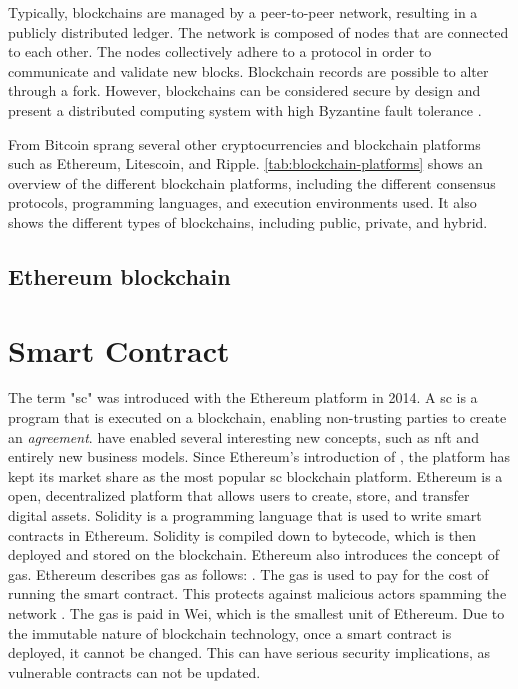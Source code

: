 Typically, blockchains are managed by a peer-to-peer network, resulting in a publicly distributed ledger. The network is composed of nodes that are connected to each other. The nodes collectively adhere to a protocol in order to communicate and validate new blocks. Blockchain records are possible to alter through a \gls{fork}. However, blockchains can be considered secure by design and present a distributed computing system with high Byzantine fault tolerance \cite{sankar2017survey}.

From Bitcoin sprang several other cryptocurrencies and blockchain platforms such as Ethereum, Litescoin, and Ripple. \cref{tab:blockchain-platforms} shows an overview of the different blockchain platforms, including the different consensus protocols, programming languages, and execution environments used. It also shows the different types of blockchains, including public, private, and hybrid.


\subsection{Ethereum blockchain}
\label{sec:ethereum}


\section{Smart Contract}
\label{sec:smart-contract}

The term "\acrlong{sc}" was introduced with the Ethereum platform in 2014. A \acrfull{sc} is a program that is executed on a blockchain, enabling non-trusting parties to create an \textit{agreement}.  have enabled several interesting new concepts, such as \acrfull{nft} and entirely new business models. Since Ethereum's introduction of , the platform has kept its market share as the most popular \acrshort{sc} blockchain platform. Ethereum is a open, decentralized platform that allows users to create, store, and transfer digital assets. Solidity is a programming language that is used to write smart contracts in Ethereum. Solidity is compiled down to bytecode, which is then deployed and stored on the blockchain. Ethereum also introduces the concept of gas. Ethereum describes gas as follows:  \cite{ethereum2021gas}. The gas is used to pay for the cost of running the smart contract. This protects against malicious actors spamming the network \cite{ethereum2021gas}. The gas is paid in Wei, which is the smallest unit of Ethereum. Due to the immutable nature of blockchain technology, once a smart contract is deployed, it cannot be changed. This can have serious security implications, as vulnerable contracts can not be updated.

